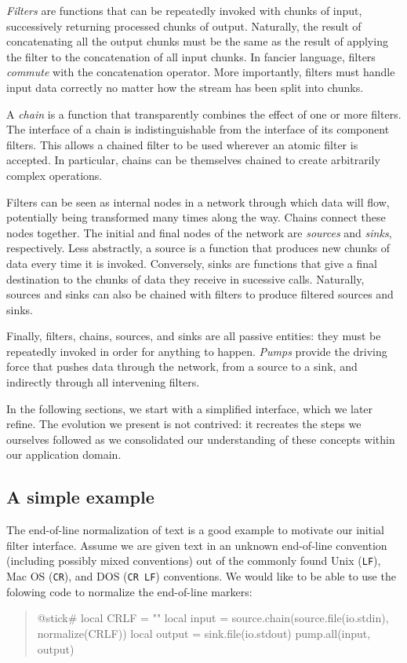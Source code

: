 \documentclass[10pt]{article}
\newcommand{\CR}{\texttt{CR}}
\newcommand{\LF}{\texttt{LF}}
\newcommand{\CRLF}{\texttt{CR~LF}}
\begin{document}
			\emph{Filters} are functions that can be repeatedly invoked
			with chunks of input, successively returning processed
			chunks of output. Naturally, the result of
			concatenating all the output chunks must be the same as the
			result of applying the filter to the concatenation of all
			input chunks. In fancier language, filters \emph{commute}
			with the concatenation operator. More importantly, filters
			must handle input data correctly no matter how the stream
			has been split into chunks. 
			
			A \emph{chain} is a function that transparently combines the
			effect of one or more filters. The interface of a chain is
			indistinguishable from the interface of its component
			filters.  This  allows a chained filter to be used wherever
			an atomic filter is accepted. In particular, chains can be
			themselves chained to create arbitrarily complex operations.
			
			Filters can be seen as internal nodes in a network through
			which data will flow, potentially being transformed many
			times along the way.  Chains connect these nodes together.
			The initial and final nodes of the network are
			\emph{sources} and \emph{sinks}, respectively.  Less
			abstractly, a source is a function that produces new chunks
			of data every time it is invoked.  Conversely, sinks are
			functions that give a final destination to the chunks of
			data they receive in sucessive calls.  Naturally, sources
			and sinks can also be chained with filters to produce
			filtered sources and sinks.
			
			Finally, filters, chains, sources, and sinks are all passive
			entities: they must be repeatedly invoked in order for
			anything to happen.  \emph{Pumps} provide the driving force
			that pushes data through the network, from a source to a
			sink, and indirectly through all intervening filters.
			
			In the following sections, we start with a simplified
			interface, which we later refine. The evolution we present
			is not contrived: it recreates the steps we ourselves
			followed as we consolidated our understanding of these
			concepts within our application domain. 
			
			\subsection{A simple example}
			
			The end-of-line normalization of text is a good
			example to motivate our initial filter interface. 
			Assume we are given text in an unknown end-of-line
			convention (including possibly mixed conventions) out of the
			commonly found Unix (\LF), Mac OS (\CR), and
			DOS (\CRLF) conventions. We would like to be able to 
			use the folowing code to normalize the end-of-line markers: 
			\begin{quote}
			\begin{lua}
			@stick#
			local CRLF = ""
			local input = source.chain(source.file(io.stdin), normalize(CRLF))
			local output = sink.file(io.stdout)
			pump.all(input, output)
			\end{lua}
			\end{quote}
			
\end{document}
